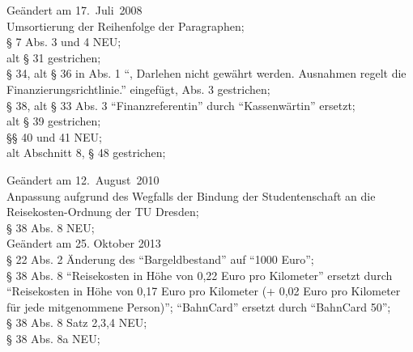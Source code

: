 Geändert am 17.~Juli~2008\\
Umsortierung der Reihenfolge der Paragraphen;\\
§ 7 Abs. 3 und 4 NEU;\\
alt § 31 gestrichen;\\
§ 34, alt § 36 in Abs. 1 "`, Darlehen nicht gewährt werden. Ausnahmen regelt die Finanzierungsrichtlinie."' eingefügt, Abs. 3 gestrichen;\\
§ 38, alt § 33 Abs. 3 "`Finanzreferentin"' durch "`Kassenwärtin"' ersetzt;\\
alt § 39 gestrichen;\\
§§ 40 und 41 NEU;\\
alt Abschnitt 8, § 48 gestrichen;

Geändert am 12.~August~2010\\
Anpassung aufgrund des Wegfalls der Bindung der Studentenschaft an die Reisekosten-Ordnung der TU Dresden;\\
§ 38 Abs. 8 NEU;\\


Geändert am 25. Oktober 2013\\
§ 22 Abs. 2 Änderung des "`Bargeldbestand"' auf "`1000 Euro"';\\
§ 38 Abs. 8 "`Reisekosten in Höhe von 0,22 Euro pro Kilometer"' ersetzt durch "`Reisekosten in Höhe von 0,17 Euro pro Kilometer (+ 0,02 Euro pro Kilometer für jede mitgenommene Person)"'; "`BahnCard"' ersetzt durch "`BahnCard 50"';\\
§ 38 Abs. 8 Satz 2,3,4 NEU;\\
§ 38 Abs. 8a NEU;\\

